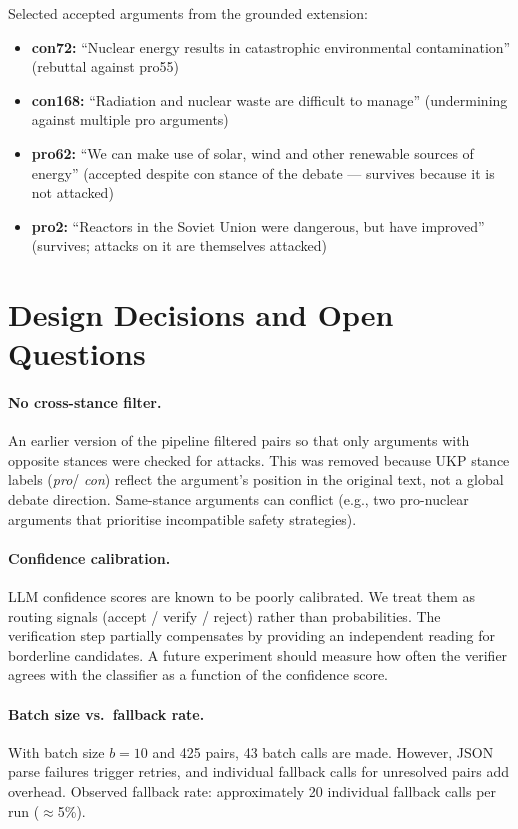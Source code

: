 \documentclass[runningheads]{llncs}
\begin{document}
Selected accepted arguments from the grounded extension:
\begin{itemize}
  \item \textbf{con72:} ``Nuclear energy results in catastrophic
    environmental contamination'' (rebuttal against pro55)
  \item \textbf{con168:} ``Radiation and nuclear waste are difficult
    to manage'' (undermining against multiple pro arguments)
  \item \textbf{pro62:} ``We can make use of solar, wind and other
    renewable sources of energy'' (accepted despite con stance of
    the debate — survives because it is not attacked)
  \item \textbf{pro2:} ``Reactors in the Soviet Union were dangerous,
    but have improved'' (survives; attacks on it are themselves attacked)
\end{itemize}

\section{Design Decisions and Open Questions}
\label{sec:design}

\paragraph{No cross-stance filter.} An earlier version of the pipeline
filtered pairs so that only arguments with opposite stances were checked
for attacks. This was removed because UKP stance labels (\emph{pro}/
\emph{con}) reflect the argument's position in the original text, not a
global debate direction. Same-stance arguments can conflict (e.g., two
pro-nuclear arguments that prioritise incompatible safety strategies).

\paragraph{Confidence calibration.} LLM confidence scores are known to be
poorly calibrated. We treat them as routing signals (accept / verify /
reject) rather than probabilities. The verification step partially
compensates by providing an independent reading for borderline candidates.
A future experiment should measure how often the verifier agrees with the
classifier as a function of the confidence score.

\paragraph{Batch size vs.\ fallback rate.} With batch size $b=10$ and 425
pairs, 43 batch calls are made. However, JSON parse failures trigger
retries, and individual fallback calls for unresolved pairs add
overhead. Observed fallback rate: approximately 20 individual fallback
calls per run ($\approx$5\%).
\end{document}
